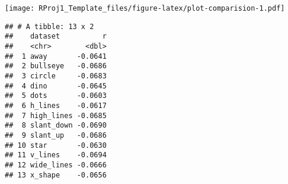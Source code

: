 \documentclass[
]{article}
\newenvironment{Shaded}{\begin{snugshade}}{\end{snugshade}}
\newcommand{\DataTypeTok}[1]{\textcolor[rgb]{0.13,0.29,0.53}{#1}}
\newcommand{\DecValTok}[1]{\textcolor[rgb]{0.00,0.00,0.81}{#1}}
\newcommand{\KeywordTok}[1]{\textcolor[rgb]{0.13,0.29,0.53}{\textbf{#1}}}
\newcommand{\NormalTok}[1]{#1}
\newcommand{\OperatorTok}[1]{\textcolor[rgb]{0.81,0.36,0.00}{\textbf{#1}}}
\newcommand{\StringTok}[1]{\textcolor[rgb]{0.31,0.60,0.02}{#1}}
\begin{document}
\texttt{[image: RProj1\_Template\_files/figure-latex/plot-comparision-1.pdf]}

\begin{Shaded}
\end{Shaded}

\begin{verbatim}
## # A tibble: 13 x 2
##    dataset          r
##    <chr>        <dbl>
##  1 away       -0.0641
##  2 bullseye   -0.0686
##  3 circle     -0.0683
##  4 dino       -0.0645
##  5 dots       -0.0603
##  6 h_lines    -0.0617
##  7 high_lines -0.0685
##  8 slant_down -0.0690
##  9 slant_up   -0.0686
## 10 star       -0.0630
## 11 v_lines    -0.0694
## 12 wide_lines -0.0666
## 13 x_shape    -0.0656
\end{verbatim}
\end{document}
